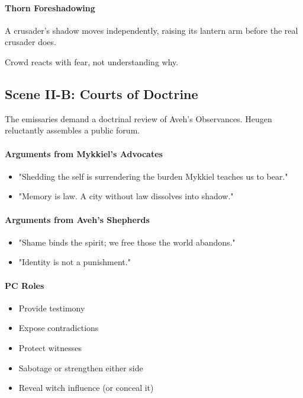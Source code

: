 \documentclass[11pt]{book}
\begin{document}
\paragraph{Thorn Foreshadowing}
A crusader's shadow moves independently, raising its lantern arm before
the real crusader does.

Crowd reacts with fear, not understanding why.

\subsection*{Scene II-B: Courts of Doctrine}

The emissaries demand a doctrinal review of Aveh's Observances.
Heugen reluctantly assembles a public forum.

\paragraph{Arguments from Mykkiel's Advocates}
\begin{itemize}[leftmargin=*]
    \item "Shedding the self is surrendering the burden Mykkiel teaches us to bear."
    \item "Memory is law. A city without law dissolves into shadow."
\end{itemize}

\paragraph{Arguments from Aveh's Shepherds}
\begin{itemize}[leftmargin=*]
    \item "Shame binds the spirit; we free those the world abandons."
    \item "Identity is not a punishment."
\end{itemize}

\paragraph{PC Roles}
\begin{itemize}[leftmargin=*]
    \item Provide testimony  
    \item Expose contradictions  
    \item Protect witnesses  
    \item Sabotage or strengthen either side  
    \item Reveal witch influence (or conceal it)
\end{itemize}
\end{document}
